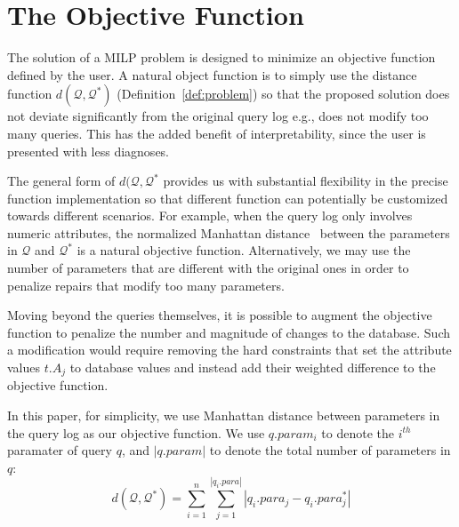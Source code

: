 \section{The Objective Function}

The solution of a MILP problem is designed to minimize an objective function defined by the user.
A natural object function is to simply use the distance function $d(\mathcal{Q}, \mathcal{Q}^*)$ 
(Definition~\ref{def:problem}) so that the proposed solution
does not deviate significantly from the original query log e.g., does not modify too many queries.  
This has the added benefit of interpretability, since the user is presented with less diagnoses.

The general form of $d(\mathcal{Q}, \mathcal{Q}^*$ provides us with substantial flexibility in the precise
function implementation so that different function can potentially be customized towards different scenarios.
For example, when the query log only involves numeric attributes, 
the normalized Manhattan distance~\cite{manhattan} between the parameters 
in $\mathcal{Q}$ and $\mathcal{Q}^*$ is a natural objective function.
Alternatively, we may use the number of parameters that are different with the original ones 
in order to penalize repairs that modify too many parameters. 

Moving beyond the queries themselves,  it is possible to augment the objective function 
to penalize the number and magnitude of changes to the database.
Such a modification would require removing the hard constraints that set the
attribute values $t.A_j$ to database values and instead add their weighted difference
to the objective function.

In this paper, for simplicity, we use Manhattan distance between parameters 
in the query log as our objective function.  We use $q.param_i$ to denote the $i^{th}$ paramater of query $q$,
and $|q.param|$ to denote the total number of parameters in $q$:
\[d(\mathcal{Q}, \mathcal{Q}^*) = \sum_{i = 1} ^{n} \sum_{j = 1}^{|q_i.para|} |q_i.para_j - q_i.para_j^*|\]

% 
% 
% 
